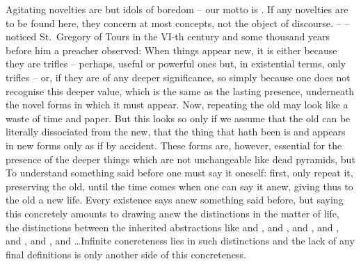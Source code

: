 Agitating novelties are but idols of boredom -- our motto is . If
any novelties are to be found here, they concern at most concepts, not the
object of discourse.  {} --  --
noticed St.~Gregory of Tours in the VI-th century and some thousand years before
him a preacher observed:  When things appear new, it is either
because they are trifles -- perhaps, useful or powerful ones but, in existential terms, only
trifles -- or, if they are of any deeper significance, so simply because one
does not recognise this deeper value, which is the same as the lasting presence,
underneath the novel forms in which it must appear.  Now, repeating the old may
look like a waste of time and paper.  But this looks so only if we assume that
the old can be literally dissociated from the new, that the thing that hath been
is  and appears in new forms only as if by accident.  These forms
are, however, essential for the presence of the deeper things which are not
unchangeable like dead pyramids, but 
 To understand something said
before one must say 
it oneself: first, only repeat it, preserving the old, until the time comes when
one can say it anew, giving thus to the old a new life. Every existence says
anew something said before, but saying this concretely amounts to drawing anew
the distinctions in the matter of life, the distinctions between the inherited
abstractions like  and ,  and
,  and ,  and ,
 and ,  and ,  and
\ldots Infinite concreteness lies in such distinctions and the lack
of any final definitions is only another side of this concreteness.
%
%

